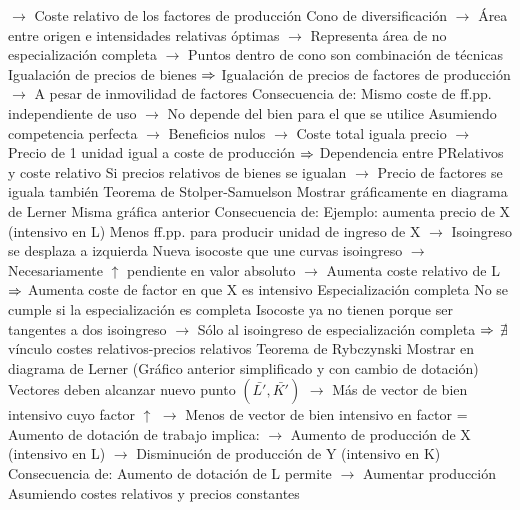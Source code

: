 \documentclass{nuevotema}
\begin{document}
\begin{esquemal}
				\4[] $\to$ Coste relativo de los factores de producción
				\4[] Cono de diversificación
				\4[] $\to$ Área entre origen e intensidades relativas óptimas
				\4[] $\to$ Representa área de no especialización completa
				\4[] $\to$ Puntos dentro de cono son combinación de técnicas
				\4[] Igualación de precios de bienes
				\4[] $\Rightarrow$ Igualación de precios de factores de producción
				\4[] $\to$ A pesar de inmovilidad de factores
				\4 Consecuencia de:
				\4[] Mismo coste de ff.pp. independiente de uso
				\4[] $\to$ No depende del bien para el que se utilice
				\4[] Asumiendo competencia perfecta
				\4[] $\to$ Beneficios nulos
				\4[] $\to$ Coste total iguala precio
				\4[] $\to$ Precio de 1 unidad igual a coste de producción
				\4[] $\Rightarrow$ Dependencia entre PRelativos y coste relativo
				\4[] Si precios relativos de bienes se igualan
				\4[] $\to$ Precio de factores se iguala también
			\3 Teorema de Stolper-Samuelson
				\4 
				\4[] Mostrar gráficamente en diagrama de Lerner
				\4[] Misma gráfica anterior
				\4 Consecuencia de:
				\4[] Ejemplo: aumenta precio de X (intensivo en L)
				\4[] Menos ff.pp. para producir unidad de ingreso de X
				\4[] $\to$ Isoingreso se desplaza a izquierda
				\4[] Nueva isocoste que une curvas isoingreso
				\4[] $\to$ Necesariamente $\uparrow$ pendiente en valor absoluto
				\4[] $\to$ Aumenta coste relativo de L
				\4[] $\Rightarrow$ Aumenta coste de factor en que X es intensivo
				\4 Especialización completa
				\4[] No se cumple si la especialización es completa
				\4[] Isocoste ya no tienen porque ser tangentes a dos isoingreso
				\4[] $\to$ Sólo al isoingreso de especialización completa
				\4[] $\Rightarrow$ $\nexists$ vínculo costes relativos-precios relativos
			\3 Teorema de Rybczynski
				\4 
				\4[] Mostrar en diagrama de Lerner
				\4[] (Gráfico anterior simplificado y con cambio de dotación)
				\4[] 
				\4[] Vectores deben alcanzar nuevo punto $(\bar{L'},\bar{K'})$
				\4[] $\to$ Más de vector de bien intensivo cuyo factor $\uparrow$
				\4[] $\to$ Menos de vector de bien intensivo en factor =
				\4[] Aumento de dotación de trabajo implica:
				\4[] $\to$ Aumento de producción de X (intensivo en L)
				\4[] $\to$ Disminución de producción de Y (intensivo en K)
				\4 Consecuencia de:
				\4[] Aumento de dotación de L permite
				\4[] $\to$ Aumentar producción
				\4[] Asumiendo costes relativos y precios constantes

\end{esquemal}
\end{document}
